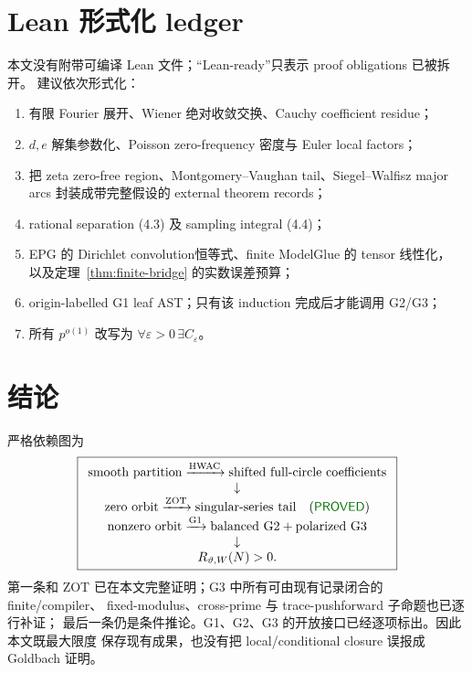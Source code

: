 \documentclass[11pt,a4paper]{ctexart}
\theoremstyle{definition}
\newcommand{\1}{\mathbf 1}
\newcommand{\PROVED}{\textcolor{green!45!black}{\textsf{PROVED}}}
\begin{document}
\section{Lean 形式化 ledger}

本文没有附带可编译 Lean 文件；“Lean-ready”只表示 proof obligations 已被拆开。
建议依次形式化：
\begin{enumerate}
\item 有限 Fourier 展开、Wiener 绝对收敛交换、Cauchy coefficient residue；
\item $d,e$ 解集参数化、Poisson zero-frequency 密度与 Euler local factors；
\item 把 zeta zero-free region、Montgomery--Vaughan tail、Siegel--Walfisz
major arcs 封装成带完整假设的 external theorem records；
\item rational separation (4.3) 及 sampling integral (4.4)；
\item EPG 的 Dirichlet convolution恒等式、finite ModelGlue 的 tensor 线性化，
以及定理~\ref{thm:finite-bridge} 的实数误差预算；
\item origin-labelled G1 leaf AST；只有该 induction 完成后才能调用 G2/G3；
\item 所有 $p^{o(1)}$ 改写为 $\forall\varepsilon>0\,\exists C_\varepsilon$。
\end{enumerate}

\section{结论}

严格依赖图为
\[
\boxed{
\begin{array}{c}
\text{smooth partition}\xrightarrow{\rm HWAC}
\text{shifted full-circle coefficients}\\
\downarrow\\
\text{zero orbit}\xrightarrow{\rm ZOT}
\text{singular-series tail}\quad(\PROVED)\\
\text{nonzero orbit}\xrightarrow{\rm G1}
\text{balanced G2}+\text{polarized G3}\\
\downarrow\\
R_{\vartheta,W}(N)>0.
\end{array}}
\]
第一条和 ZOT 已在本文完整证明；G3 中所有可由现有记录闭合的 finite/compiler、
fixed-modulus、cross-prime 与 trace-pushforward 子命题也已逐行补证；
最后一条仍是条件推论。G1、G2、G3 的开放接口已经逐项标出。因此本文既最大限度
保存现有成果，也没有把 local/conditional closure 误报成 Goldbach 证明。
\end{document}
